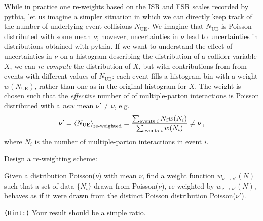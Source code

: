 \begin{subappendices}
\begin{example}
    \label{ex:reweighting-ue}
    While in practice one re-weights based on the ISR and FSR scales recorded by \gls{pythia}, let us imagine a simpler situation in which we can directly keep track of the number of underlying event collisions \(N_\text{UE}\).
    We imagine that \(N_\text{UE}\) is Poisson distributed with some mean \(\nu\);
    however, uncertainties in \(\nu\) lead to uncertainties in distributions obtained with \gls{pythia}.
    If we want to understand the effect of uncertainties in \(\nu\) on a histogram describing the distribution of a collider variable \(X\), we can \textit{re-compute} the distribution of \(X\), but with  contributions from from events with different values of \(N_\text{UE}\):
    each event fills a histogram bin with a weight \(w(N_\text{UE})\), rather than one as in the original histogram for \(X\).
    The weight is chosen such that the \textit{effective} number of of multiple-parton interactions is Poisson distributed with a \textit{new} mean \(\nu' \neq \nu\), e.g.
    \begin{align}
        \label{eq:re-weighting-ue}
        \nu'
        =
        \le\langle N_\text{UE}\ri\rangle_\text{re-weighted}
        =
        \frac{
            \sum_{\text{events } i}
            N_i w(N_i)
        }{
            \sum_{\text{events } i}
            w(N_i)
        }
        \neq
        \nu
        \,,
    \end{align}
    where \(N_i\) is the number of multiple-parton interactions in event \(i\).
\end{example}

\begin{exercise}
    Design a re-weighting scheme:

    Given a distribution Poisson($\nu$) with mean \(\nu\), find a weight function \(w_{\nu \to \nu'}(N)\) such that a set of data \(\{N_i\}\) drawn from Poisson($\nu$), re-weighted by \(w_{\nu \to \nu'}(N)\), behaves as if it were drawn from the distinct Poisson distribution Poisson($\nu'$).

    \vspace{7pt}

    \texttt{(Hint:)}
    Your result should be a simple ratio.
\end{exercise}





\end{subappendices}
